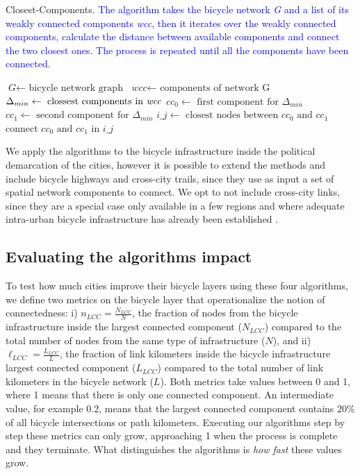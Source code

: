\begin{algorithm}[h!]
  \caption{Closest-Components. \textcolor{blue}{The algorithm takes the bicycle network \textit{G} and a list of its weakly connected components \textit{wcc}, then it iterates over the weakly connected components, calculate the distance between available components and connect the two closest ones. The process is repeated until all the components have been connected.}}\label{al:CC}
  \begin{algorithmic}[1]
    \State $\textit{G} \gets \text{ bicycle network graph}$
    \State $\textit{wcc} \gets \text{ components of network G}$
    \State $\Delta_{min} \gets \text{ clossest components in \textit{wcc}}$
    \State $cc_{0} \gets \text{ first component for }\Delta_{min}$
    \State $cc_{1} \gets \text{ second component for } \Delta_{min}$
    \State $\textit{i\_j} \gets \text{ closest nodes between } cc_{0} \text{ and } cc_{1}$
    \State $\text{connect } cc_{0} \text{ and } cc_{1} \text{ in } i\_j$
    \EndFor
    \EndProcedure
  \end{algorithmic}
\end{algorithm}

We apply the algorithms to the bicycle infrastructure inside the political demarcation of the cities, however it is possible to extend the methods and include bicycle highways and cross-city trails, since they use as input a set of spatial network components to connect. We opt to not include cross-city links, since they are a special case only available in a few regions and where adequate intra-urban bicycle infrastructure has already been established \cite{Hildebrandt2013BicycleHighways,Taciuk2018Bicycle}.

\subsection{Evaluating the algorithms impact}

To test how much cities improve their bicycle layers using these four algorithms, we define two metrics on the bicycle layer that operationalize the notion of connectedness: i) $n_{LCC} = \frac{N_{LCC}}{N} $, the fraction of nodes from the bicycle infrastructure inside the largest connected component ($N_{LCC}$) compared to the total number of nodes from the same type of infrastructure ($N$), and ii) $\ell_{LCC} = \frac{L_{LCC}}{L} $, the fraction of link kilometers inside the bicycle infrastructure largest connected component ($L_{LCC}$) compared to the total number of link kilometers in the bicycle network ($L$). Both metrics take values between 0 and 1, where 1 means that there is only one connected component. An intermediate value, for example 0.2, means that the largest connected component contains 20\% of all bicycle intersections or path kilometers. Executing our algorithms step by step these metrics can only grow, approaching 1 when the process is complete and they terminate. What distinguishes the algorithms is \emph{how fast} these values grow.

